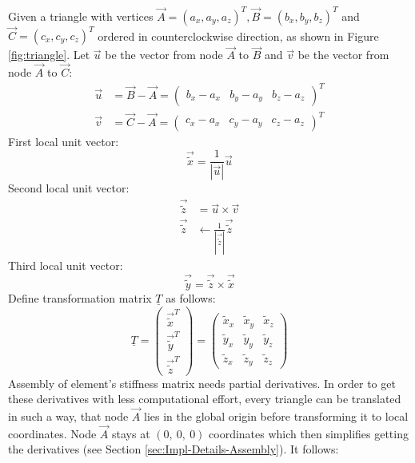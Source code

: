   Given a triangle with vertices $\vec{A} = (a_x, a_y, a_z)^T, \vec{B} = (b_x, b_y, b_z)^T$ and $\vec{C} = (c_x, c_y, c_z)^T$ ordered in counterclockwise direction, as shown in Figure \ref{fig:triangle}. Let $\vec{u}$ be the vector from node $\vec{A}$ to $\vec{B}$ and $\vec{v}$ be the vector from node $\vec{A}$ to $\vec{C}$:
  \begin{align*}
  \vec{u} &= \vec{B}-\vec{A} = \begin{pmatrix}
  b_x - a_x & b_y - a_y & b_z - a_z
  \end{pmatrix}^T\\
  \vec{v} &= \vec{C}-\vec{A} = \begin{pmatrix}
  c_x - a_x & c_y - a_y & c_z - a_z
  \end{pmatrix}^T
  \end{align*}
  First local unit vector:
  \begin{equation*}
   \vec{\tilde{x}} = \frac{1}{\left|\vec{u}\right|}\vec{u}
  \end{equation*}
  Second local unit vector:
  \begin{align*}
   \vec{\tilde{z}} &= \vec{u} \times \vec{v} \\
   \vec{\tilde{z}} &\leftarrow \frac{1}{\left|\vec{\tilde{z}}\right|}\vec{\tilde{z}}
  \end{align*}
  Third local unit vector:
  \begin{equation*}
   \vec{\tilde{y}} = \vec{\tilde{z}} \times \vec{\tilde{x}}
  \end{equation*}
  Define transformation matrix $\underline{T}$ as follows:
  \begin{equation}\label{eq:trafoT_tri}
   \underline{T} = \begin{pmatrix}
   \vec{\tilde{x}}^T\\ \vec{\tilde{y}}^T\\ \vec{\tilde{z}}^T
   \end{pmatrix} = \begin{pmatrix}
   \tilde{x}_x & \tilde{x}_y & \tilde{x}_z\\
   \tilde{y}_x & \tilde{y}_y & \tilde{y}_z\\
   \tilde{z}_x & \tilde{z}_y & \tilde{z}_z
   \end{pmatrix}
  \end{equation}
  Assembly of element's stiffness matrix needs partial derivatives. In order to get these derivatives with less computational effort, every triangle can be translated in such a way, that node $\vec{A}$ lies in the global origin before transforming it to local coordinates. Node $\vec{A}$ stays at $(0,\ 0,\ 0)$ coordinates which then simplifies getting the derivatives (see Section \ref{sec:Impl-Details-Assembly}). It follows:

